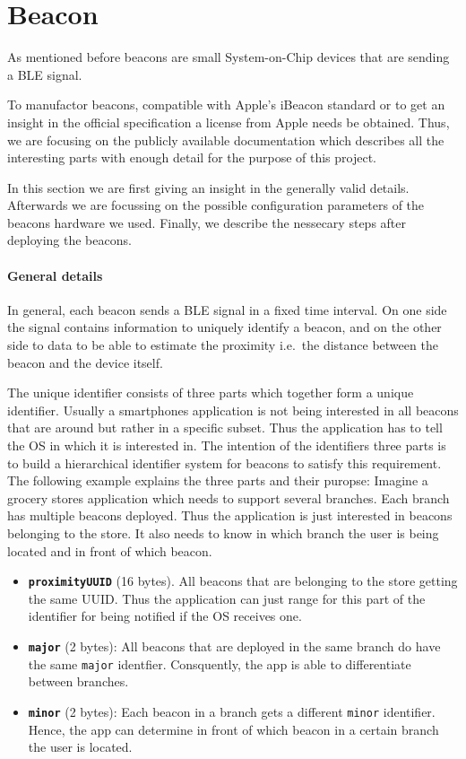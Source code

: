 \section{Beacon}\label{sec:beacon}
As mentioned before beacons are small System-on-Chip devices that are sending a \acs{BLE} signal.

To manufactor beacons, compatible with Apple's iBeacon standard or to get an insight in the official specification a license from Apple needs be obtained.
Thus, we are focusing on the publicly available documentation which describes all the interesting parts with enough detail for the purpose of this project.

In this section we are first giving an insight in the generally valid details.
Afterwards we are focussing on the possible configuration parameters of the beacons hardware we used.
Finally, we describe the nessecary steps after deploying the beacons.

\paragraph{General details} In general, each beacon sends a \acs{BLE} signal in a fixed time interval.
On one side the signal contains information to uniquely identify a beacon, and on the other side to data to be able to estimate the proximity i.e.\ the distance between the beacon and the device itself.

The unique identifier consists of three parts which together form a unique identifier. Usually a smartphones application is not being interested in all beacons that are around but rather in a specific subset. Thus the application has to tell the \acs{OS} in which it is interested in. The intention of the identifiers three parts is to build a hierarchical identifier system for beacons to satisfy this requirement. The following example explains the three parts and their puropse:
Imagine a grocery stores application which needs to support several branches.
Each branch has multiple beacons deployed.
Thus the application is just interested in beacons belonging to the store.
It also needs to know in which branch the user is being located and in front of which beacon.
\begin{itemize}
  \item \textbf{\texttt{proximityUUID}} (16 bytes). All beacons that are belonging to the store getting the same \acl{UUID}. Thus the application can just range for this part of the identifier for being notified if the \acs{OS} receives one.
  \item \textbf{\texttt{major}} (2 bytes): All beacons that are deployed in the same branch do have the same \texttt{major} identfier. Consquently, the app is able to differentiate between branches.
  \item \textbf{\texttt{minor}} (2 bytes): Each beacon in a branch gets a different \texttt{minor} identifier. Hence, the app can determine in front of which beacon in a certain branch the user is located.
\end{itemize}

